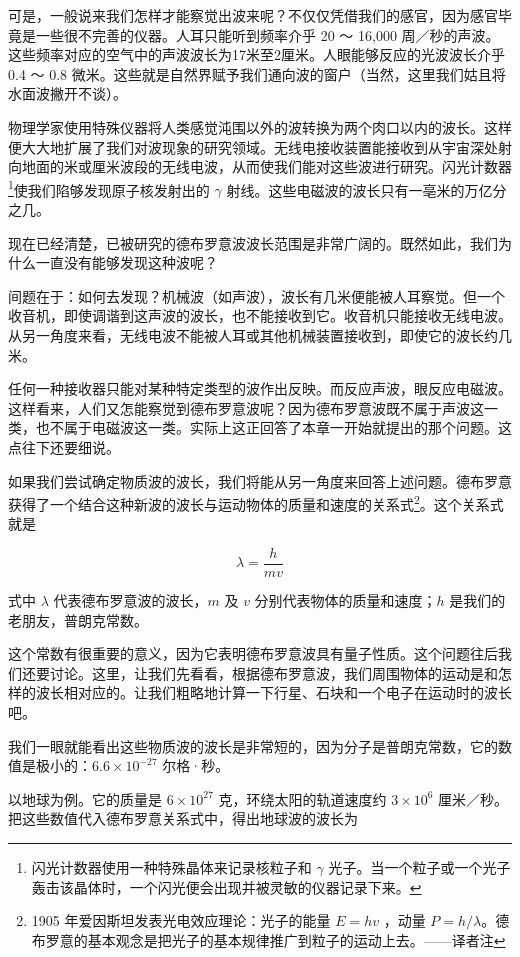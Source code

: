 可是，一般说来我们怎样才能察觉出波来呢？不仅仅凭借我们的感官，因为感官毕竟是一些很不完善的仪器。人耳只能听到频率介乎 20 ～ 16,000 周／秒的声波。这些频率对应的空气中的声波波长为17米至2厘米。人眼能够反应的光波波长介乎 0.4 ～ 0.8 微米。这些就是自然界赋予我们通向波的窗户（当然，这里我们姑且将水面波撇开不谈）。

物理学家使用特殊仪器将人类感觉沌围以外的波转换为两个肉口以内的波长。这样便大大地扩展了我们对波现象的研究领域。无线电接收装置能接收到从宇宙深处射向地面的米或厘米波段的无线电波，从而使我们能对这些波进行研究。闪光计数器\footnote{闪光计数器使用一种特殊晶体来记录核粒子和 $\gamma$ 光子。当一个粒子或一个光子轰击该晶体时，一个闪光便会出现并被灵敏的仪器记录下来。}使我们陷够发现原子核发射出的 $\gamma$ 射线。这些电磁波的波长只有一亳米的万亿分之几。

现在已经清楚，已被研究的德布罗意波波长范围是非常广阔的。既然如此，我们为什么一直没有能够发现这种波呢？

间题在于：如何去发现？机械波（如声波），波长有几米便能被人耳察觉。但一个收音机，即使调谐到这声波的波长，也不能接收到它。收音机只能接收无线电波。从另一角度来看，无线电波不能被人耳或其他机械装置接收到，即使它的波长约几米。

任何一种接收器只能对某种特定类型的波作出反映。而反应声波，眼反应电磁波。这样看来，人们又怎能察觉到德布罗意波呢？因为德布罗意波既不属于声波这一类，也不属于电磁波这一类。实际上这正回答了本章一开始就提出的那个问题。这点往下还要细说。

如果我们尝试确定物质波的波长，我们将能从另一角度来回答上述问题。德布罗意获得了一个结合这种新波的波长与运动物体的质量和速度的关系式\footnote{1905 年爱因斯坦发表光电效应理论：光子的能量 $E=h v$ ，动量 \(P=h / \lambda\)。德布罗意的基本观念是把光子的基本规律推广到粒子的运动上去。——译者注}。这个关系式就是

$$
\lambda=\frac{h}{m v}
$$

式中 $\lambda$ 代表德布罗意波的波长，$m$ 及 $v$ 分别代表物体的质量和速度；$h$ 是我们的老朋友，普朗克常数。

这个常数有很重要的意义，因为它表明德布罗意波具有量子性质。这个问题往后我们还要讨论。这里，让我们先看看，根据德布罗意波，我们周围物体的运动是和怎样的波长相对应的。让我们粗略地计算一下行星、石块和一个电子在运动时的波长吧。

我们一眼就能看出这些物质波的波长是非常短的，因为分子是普朗克常数，它的数值是极小的：$6.6 \times 10^{-27}$ 尔格·秒。

以地球为例。它的质量是 $6 \times 10^{27}$ 克，环绕太阳的轨道速度约 $3 \times 10^{6}$ 厘米／秒。把这些数值代入德布罗意关系式中，得出地球波的波长为

